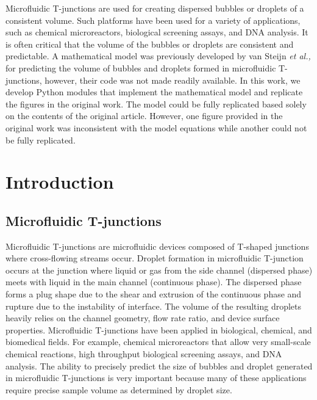 \noindent
Microfluidic T-junctions are used for creating dispersed bubbles or droplets
of a consistent volume. Such platforms have been used for a variety of applications,
such as chemical microreactors, biological screening assays, and DNA analysis.
It is often critical that the volume of the
bubbles or droplets are consistent and predictable. A mathematical model was
previously developed by van Steijn \emph{et al.,} for predicting the volume of bubbles and droplets formed in
microfluidic T-junctions, however, their code was not made readily available.
In this work, we develop Python modules that implement the mathematical model and 
replicate the figures in the original work. The model
could be fully replicated based solely on the contents of the original article.
However, one figure provided in the original work was inconsistent with the
model equations while another could not be fully replicated.

\section{Introduction}

\subsection{Microfluidic T-junctions}

Microfluidic T-junctions are microfluidic devices composed of T-shaped junctions
where cross-flowing streams occur. Droplet formation in microfluidic T-junction
occurs at the junction where liquid or gas from the side channel (dispersed phase)
meets with liquid in the main channel (continuous phase). The dispersed phase forms
a plug shape due to the shear and extrusion of the continuous phase and rupture due
to the instability of interface\supercite{huang_precise_2020}. The volume of the
resulting droplets heavily relies on the channel geometry, flow rate ratio, and device
surface properties\supercite{dreyfus_ordered_2003}. Microfluidic T-junctions have been
applied in biological, chemical, and biomedical
fields\supercite{casadevall_i_solvas_droplet_2011}.
For example, chemical microreactors that allow very small-scale chemical reactions, high
throughput biological screening assays, and DNA analysis\supercite{ibrahim_modeling_2021}.
The ability to precisely predict the size of bubbles and droplet generated in microfluidic
T-junctions is very important because many of these applications require
precise sample volume as determined by droplet size.

